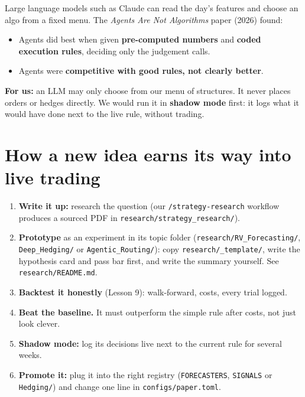 \documentclass{article}
\begin{document}
Large language models such as Claude can read the day's features and choose an algo from a fixed menu. The \emph{Agents Are Not Algorithms} paper (2026) found:

\begin{itemize}

\item Agents did best when given \textbf{pre-computed numbers} and \textbf{coded execution rules}, deciding only the judgement calls.

\item Agents were \textbf{competitive with good rules, not clearly better}.

\end{itemize}

\textbf{For us:} an LLM may only choose from our menu of structures. It never places orders or hedges directly. We would run it in \textbf{shadow mode} first: it logs what it would have done next to the live rule, without trading.

\section{How a new idea earns its way into live trading}

\begin{enumerate}

\item \textbf{Write it up:} research the question (our \texttt{/\allowbreak{}strategy-\allowbreak{}research} workflow produces a sourced PDF in \texttt{research/\allowbreak{}strategy\_\allowbreak{}research/\allowbreak{}}).

\item \textbf{Prototype} as an experiment in its topic folder (\texttt{research/\allowbreak{}RV\_\allowbreak{}Forecasting/\allowbreak{}}, \texttt{Deep\_\allowbreak{}Hedging/\allowbreak{}} or \texttt{Agentic\_\allowbreak{}Routing/\allowbreak{}}): copy \texttt{research/\allowbreak{}\_\allowbreak{}template/\allowbreak{}}, write the hypothesis card and pass bar first, and write the summary yourself. See \texttt{research/\allowbreak{}README.\allowbreak{}md}.

\item \textbf{Backtest it honestly} (Lesson 9): walk-forward, costs, every trial logged.

\item \textbf{Beat the baseline.} It must outperform the simple rule after costs, not just look clever.

\item \textbf{Shadow mode:} log its decisions live next to the current rule for several weeks.

\item \textbf{Promote it:} plug it into the right registry (\texttt{FORECASTERS}, \texttt{SIGNALS} or \texttt{Hedging/\allowbreak{}}) and change one line in \texttt{configs/\allowbreak{}paper.\allowbreak{}toml}.

\end{enumerate}
\end{document}
